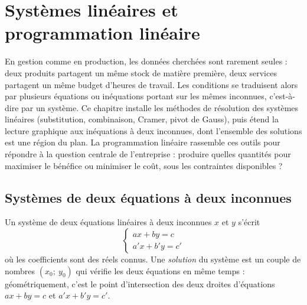 \chapter{Systèmes linéaires et programmation linéaire}

\begin{quelqueslignes}
En gestion comme en production, les données cherchées sont rarement seules : deux produits partagent un même stock de matière première, deux services partagent un même budget d'heures de travail. Les conditions se traduisent alors par plusieurs équations ou inéquations portant sur les mêmes inconnues, c'est-à-dire par un système. Ce chapitre installe les méthodes de résolution des systèmes linéaires (substitution, combinaison, Cramer, pivot de Gauss), puis étend la lecture graphique aux inéquations à deux inconnues, dont l'ensemble des solutions est une région du plan. La programmation linéaire rassemble ces outils pour répondre à la question centrale de l'entreprise : produire quelles quantités pour maximiser le bénéfice ou minimiser le coût, sous les contraintes disponibles ?
\end{quelqueslignes}

\section{Systèmes de deux équations à deux inconnues}

\begin{definition}
Un système de deux équations linéaires à deux inconnues $x$ et $y$ s'écrit
\[
\begin{cases}
ax + by = c\\
a'x + b'y = c'
\end{cases}
\]
où les coefficients sont des réels connus. Une \emph{solution} du système est un couple de nombres $(x_{0};\ y_{0})$ qui vérifie les deux équations en même temps : géométriquement, c'est le point d'intersection des deux droites d'équations $ax + by = c$ et $a'x + b'y = c'$.
\end{definition}

